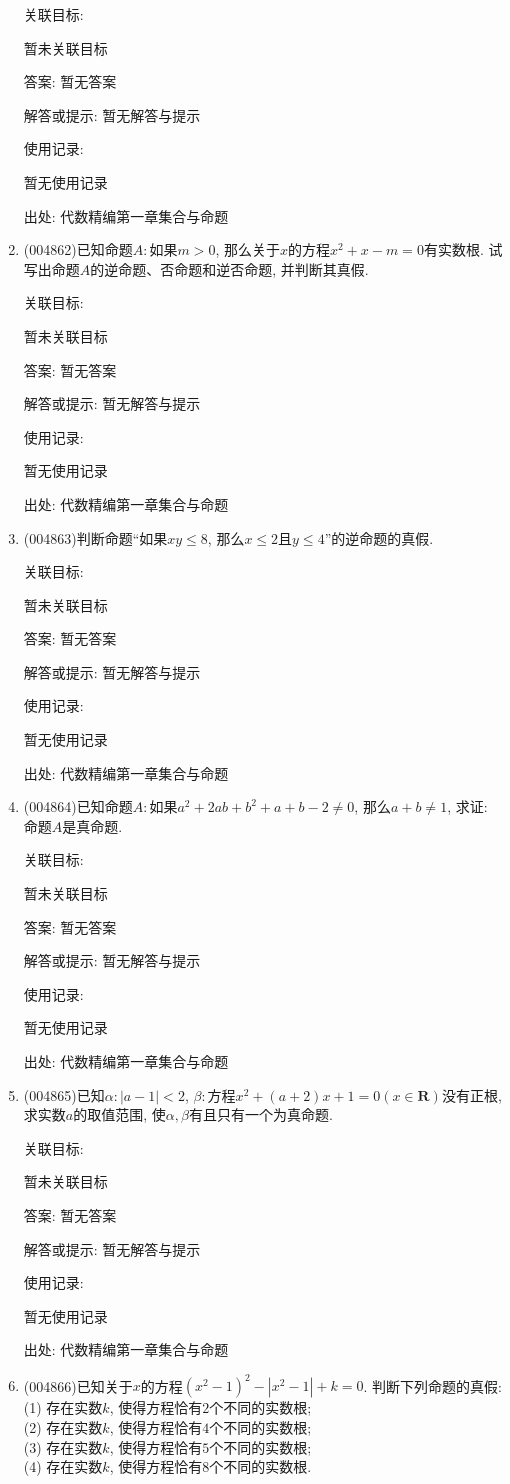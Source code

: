 \documentclass[10pt,a4paper]{article}
\begin{document}
\begin{enumerate}[1.]
关联目标:

暂未关联目标

答案: 暂无答案

解答或提示: 暂无解答与提示

使用记录:

暂无使用记录


出处: 代数精编第一章集合与命题
\item { (004862)}已知命题$A:$如果$m>0$, 那么关于$x$的方程$x^2+x-m=0$有实数根.
试写出命题$A$的逆命题、否命题和逆否命题, 并判断其真假.


关联目标:

暂未关联目标

答案: 暂无答案

解答或提示: 暂无解答与提示

使用记录:

暂无使用记录


出处: 代数精编第一章集合与命题
\item { (004863)}判断命题``如果$xy\le 8$, 那么$x\le 2$且$y\le 4$''的逆命题的真假.


关联目标:

暂未关联目标

答案: 暂无答案

解答或提示: 暂无解答与提示

使用记录:

暂无使用记录


出处: 代数精编第一章集合与命题
\item { (004864)}已知命题$A:$如果$a^2+2ab+b^2+a+b-2\ne 0$, 那么$a+b\ne 1$, 求证: 命题$A$是真命题.


关联目标:

暂未关联目标

答案: 暂无答案

解答或提示: 暂无解答与提示

使用记录:

暂无使用记录


出处: 代数精编第一章集合与命题
\item { (004865)}已知$\alpha :|a-1|<2$, $\beta:$方程$x^2+(a+2)x+1=0(x\in \mathbf{R})$没有正根, 求实数$a$的取值范围, 使$\alpha,\beta$有且只有一个为真命题.


关联目标:

暂未关联目标

答案: 暂无答案

解答或提示: 暂无解答与提示

使用记录:

暂无使用记录


出处: 代数精编第一章集合与命题
\item { (004866)}已知关于$x$的方程$(x^2-1)^2-|x^2-1|+k=0$. 判断下列命题的真假:\\
(1) 存在实数$k$, 使得方程恰有$2$个不同的实数根;\\
(2) 存在实数$k$, 使得方程恰有$4$个不同的实数根;\\
(3) 存在实数$k$, 使得方程恰有$5$个不同的实数根;\\
(4) 存在实数$k$, 使得方程恰有$8$个不同的实数根.



\end{enumerate}
\end{document}
